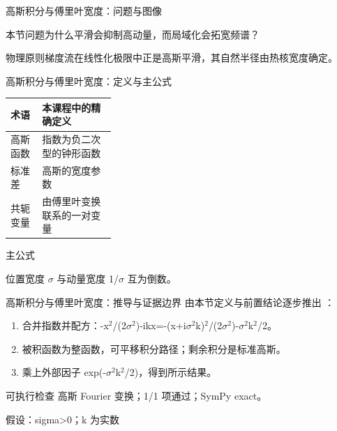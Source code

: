 \begin{frame}[t]{高斯积分与傅里叶宽度：问题与图像}
\footnotesize
\begin{block}{本节问题}为什么平滑会抑制高动量，而局域化会拓宽频谱？\end{block}
\begin{block}{物理原则}\quad 梯度流在线性化极限中正是高斯平滑，其自然半径由热核宽度确定。\end{block}
\end{frame}

\begin{frame}[t]{高斯积分与傅里叶宽度：定义与主公式}
\footnotesize\begin{tabularx}{\linewidth}{p{0.30\linewidth}Y}
\toprule 术语 & 本课程中的精确定义\\\midrule
{} 高斯函数 & 指数为负二次型的钟形函数\\
 标准差 & 高斯的宽度参数\\
 共轭变量 & 由傅里叶变换联系的一对变量\\
\bottomrule\end{tabularx}\vspace{0.15cm}
\begin{block}{ 主公式}\centering{}\end{block}
位置宽度 \ensuremath{\sigma} 与动量宽度 1/\allowbreak{}\ensuremath{\sigma} 互为倒数。
\end{frame}

\begin{frame}[t]{高斯积分与傅里叶宽度：推导与证据边界}
\footnotesize
{}\quad 由本节定义与前置结论逐步推出 ：
\begin{enumerate}
\item 合并指数并配方：-x\ensuremath{^{2}}/\allowbreak{}(2\ensuremath{\sigma}\ensuremath{^{2}})-ikx=-(x+i\ensuremath{\sigma}\ensuremath{^{2}}k)\ensuremath{^{2}}/\allowbreak{}(2\ensuremath{\sigma}\ensuremath{^{2}})-\ensuremath{\sigma}\ensuremath{^{2}}k\ensuremath{^{2}}/\allowbreak{}2。
\item 被积函数为整函数，可平移积分路径；剩余积分是标准高斯。
\item 乘上外部因子 exp(-\ensuremath{\sigma}\ensuremath{^{2}}k\ensuremath{^{2}}/\allowbreak{}2)，得到所示结果。
\end{enumerate}\begin{block}{可执行检查}
\quad 高斯 Fourier 变换；1/1 项通过；SymPy exact。
\par\scriptsize 假设：sigma>0；k 为实数
\end{block}
\end{frame}

